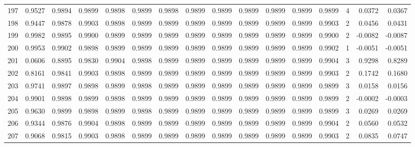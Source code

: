 \begin{tabular}{lrrrrrrrrrrrrrrr}
197 &      0.9527 &  0.9894 &  0.9899 &  0.9898 &  0.9899 &  0.9898 &  0.9899 &  0.9899 &  0.9899 &  0.9899 &   0.9899 &     0.9899 &      4 &                    0.0372 &                     0.0367 \\
198 &      0.9447 &  0.9878 &  0.9903 &  0.9898 &  0.9899 &  0.9899 &  0.9899 &  0.9899 &  0.9899 &  0.9899 &   0.9899 &     0.9903 &      2 &                    0.0456 &                     0.0431 \\
199 &      0.9982 &  0.9895 &  0.9900 &  0.9899 &  0.9899 &  0.9899 &  0.9899 &  0.9899 &  0.9899 &  0.9899 &   0.9899 &     0.9900 &      2 &                   -0.0082 &                    -0.0087 \\
200 &      0.9953 &  0.9902 &  0.9898 &  0.9899 &  0.9899 &  0.9899 &  0.9899 &  0.9899 &  0.9899 &  0.9899 &   0.9899 &     0.9902 &      1 &                   -0.0051 &                    -0.0051 \\
201 &      0.0606 &  0.8895 &  0.9830 &  0.9904 &  0.9898 &  0.9899 &  0.9899 &  0.9899 &  0.9899 &  0.9899 &   0.9899 &     0.9904 &      3 &                    0.9298 &                     0.8289 \\
202 &      0.8161 &  0.9841 &  0.9903 &  0.9898 &  0.9899 &  0.9899 &  0.9899 &  0.9899 &  0.9899 &  0.9899 &   0.9899 &     0.9903 &      2 &                    0.1742 &                     0.1680 \\
203 &      0.9741 &  0.9897 &  0.9898 &  0.9899 &  0.9898 &  0.9899 &  0.9899 &  0.9899 &  0.9899 &  0.9899 &   0.9899 &     0.9899 &      3 &                    0.0158 &                     0.0156 \\
204 &      0.9901 &  0.9898 &  0.9899 &  0.9898 &  0.9899 &  0.9899 &  0.9899 &  0.9899 &  0.9899 &  0.9899 &   0.9899 &     0.9899 &      2 &                   -0.0002 &                    -0.0003 \\
205 &      0.9630 &  0.9899 &  0.9898 &  0.9899 &  0.9898 &  0.9899 &  0.9899 &  0.9899 &  0.9899 &  0.9899 &   0.9899 &     0.9899 &      3 &                    0.0269 &                     0.0269 \\
206 &      0.9344 &  0.9876 &  0.9904 &  0.9898 &  0.9899 &  0.9899 &  0.9899 &  0.9899 &  0.9899 &  0.9899 &   0.9899 &     0.9904 &      2 &                    0.0560 &                     0.0532 \\
207 &      0.9068 &  0.9815 &  0.9903 &  0.9898 &  0.9899 &  0.9899 &  0.9899 &  0.9899 &  0.9899 &  0.9899 &   0.9899 &     0.9903 &      2 &                    0.0835 &                     0.0747 \\

\end{tabular}
